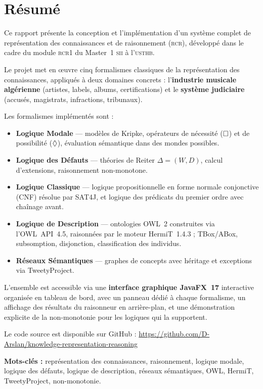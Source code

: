 \chapter*{Résumé}

Ce rapport présente la conception et l'implémentation d'un système complet de
représentation des connaissances et de raisonnement (\textsc{rcr}), développé
dans le cadre du module \textsc{rcr1} du Master~1 \textsc{sii} à l'\textsc{usthb}.

Le projet met en œuvre cinq formalismes classiques de la représentation des
connaissances, appliqués à deux domaines concrets : l'\textbf{industrie musicale
algérienne} (artistes, labels, albums, certifications) et le
\textbf{système judiciaire} (accusés, magistrats, infractions, tribunaux).

\medskip
\noindent Les formalismes implémentés sont :

\begin{itemize}
  \item \textbf{Logique Modale} — modèles de Kripke, opérateurs de nécessité
        ($\Box$) et de possibilité ($\Diamond$), évaluation sémantique dans des
        mondes possibles.
  \item \textbf{Logique des Défauts} — théories de Reiter $\Delta = (W, D)$,
        calcul d'extensions, raisonnement non-monotone.
  \item \textbf{Logique Classique} — logique propositionnelle en forme normale
        conjonctive (CNF) résolue par SAT4J, et logique des prédicats du premier
        ordre avec chaînage avant.
  \item \textbf{Logique de Description} — ontologies OWL~2 construites via
        l'OWL~API~4.5, raisonnées par le moteur HermiT~1.4.3 ; TBox/ABox,
        subsomption, disjonction, classification des individus.
  \item \textbf{Réseaux Sémantiques} — graphes de concepts avec héritage et
        exceptions via TweetyProject.
\end{itemize}

\medskip
\noindent L'ensemble est accessible via une \textbf{interface graphique JavaFX~17}
interactive organisée en tableau de bord, avec un panneau dédié à chaque
formalisme, un affichage des résultats du raisonneur en arrière-plan, et une
démonstration explicite de la non-monotonie pour les logiques qui la supportent.

Le code source est disponible sur GitHub :
\url{https://github.com/D-Arslan/knowledge-representation-reasoning}

\bigskip
\noindent\textbf{Mots-clés :} représentation des connaissances, raisonnement,
logique modale, logique des défauts, logique de description, réseaux sémantiques,
OWL, HermiT, TweetyProject, non-monotonie.

\newpage
